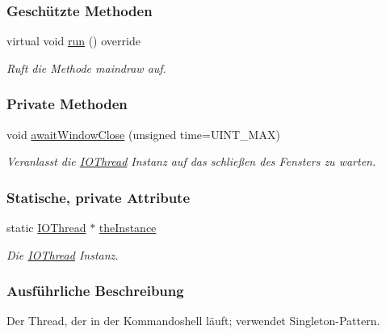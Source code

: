 \subsubsection*{Geschützte Methoden}
\begin{DoxyCompactItemize}
\item 
virtual void \mbox{\hyperlink{classIOThread_a9f1baa38fcd96609fd824f78f3072be9}{run}} () override
\begin{DoxyCompactList}\small\item\em Ruft die Methode maindraw auf. \end{DoxyCompactList}\end{DoxyCompactItemize}
\subsubsection*{Private Methoden}
\begin{DoxyCompactItemize}
\item 
void \mbox{\hyperlink{classIOThread_aef03d0e0e96b2add5f8290232bd96716}{await\+Window\+Close}} (unsigned time=U\+I\+N\+T\+\_\+\+M\+AX)
\begin{DoxyCompactList}\small\item\em Veranlasst die \mbox{\hyperlink{classIOThread}{I\+O\+Thread}} Instanz auf das schließen des Fensters zu warten. \end{DoxyCompactList}\end{DoxyCompactItemize}
\subsubsection*{Statische, private Attribute}
\begin{DoxyCompactItemize}
\item 
static \mbox{\hyperlink{classIOThread}{I\+O\+Thread}} $\ast$ \mbox{\hyperlink{classIOThread_af2909448c69876879af1fa33f3a8d97a}{the\+Instance}}
\begin{DoxyCompactList}\small\item\em Die \mbox{\hyperlink{classIOThread}{I\+O\+Thread}} Instanz. \end{DoxyCompactList}\end{DoxyCompactItemize}


\subsubsection{Ausführliche Beschreibung}
Der Thread, der in der Kommandoshell läuft; verwendet Singleton-\/\+Pattern. 

